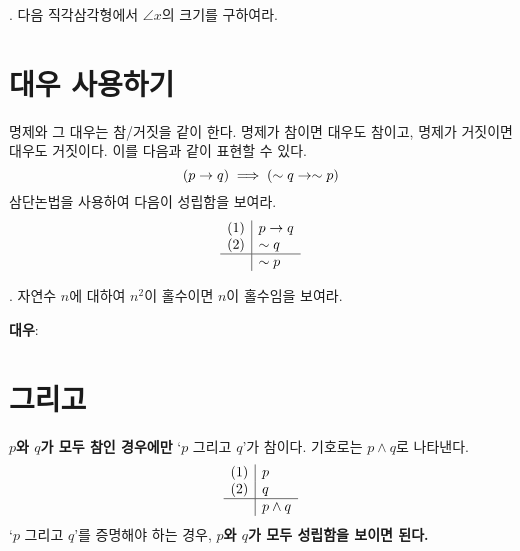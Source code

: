 \vspace*{200px}

\ex. 다음 직각삼각형에서 \(\angle x\)의 크기를 구하여라.

\begin{flushright}
    \usetikzlibrary{positioning}
\end{flushright}

\pagebreak

\section{대우 사용하기}

명제와 그 대우는 참/거짓을 같이 한다. 명제가 참이면 대우도 참이고, 명제가 거짓이면 대우도 거짓이다. 이를 다음과 같이 표현할 수 있다.
\[
    (p \rightarrow q) \implies (\sim q \rightarrow \sim p)
\]
삼단논법을 사용하여 다음이 성립함을 보여라.
\[
    \begin{array}{c|l}
        (1) & p \rightarrow q \\ (2) & \sim q \\\hline & \sim p
    \end{array}
\]

\ex. 자연수 \(n\)에 대하여 \(n^2\)이 홀수이면 \(n\)이 홀수임을 보여라.

\quad \textbf{대우}:

\pagebreak

\section{그리고}

\textbf{\(p\)와 \(q\)가 모두 참인 경우에만} `\(p\) 그리고 \(q\)'가 참이다. 기호로는 \(p \wedge q\)로 나타낸다.
\[
    \begin{array}{c|l}
        (1) & p  \\ (2) & q \\\hline & p \wedge q
    \end{array}
\]
`\(p\) 그리고 \(q\)'를 증명해야 하는 경우, \textbf{\(p\)와 \(q\)가 모두 성립함을 보이면 된다.}

